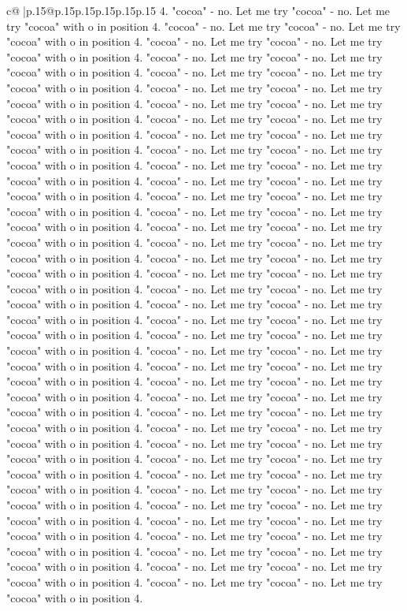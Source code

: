 \documentclass{article}
\begin{document}
{\begin{supertabular}{c@{$\;$}|p{.15\linewidth}@{}p{.15\linewidth}p{.15\linewidth}p{.15\linewidth}p{.15\linewidth}p{.15\linewidth}}
{{{4. "cocoa" {-} no. Let me try "cocoa" {-} no. Let me try "cocoa" with o in position 4. "cocoa" {-} no. Let me try "cocoa" {-} no. Let me try "cocoa" with o in position 4. "cocoa" {-} no. Let me try "cocoa" {-} no. Let me try "cocoa" with o in position 4. "cocoa" {-} no. Let me try "cocoa" {-} no. Let me try "cocoa" with o in position 4. "cocoa" {-} no. Let me try "cocoa" {-} no. Let me try "cocoa" with o in position 4. "cocoa" {-} no. Let me try "cocoa" {-} no. Let me try "cocoa" with o in position 4. "cocoa" {-} no. Let me try "cocoa" {-} no. Let me try "cocoa" with o in position 4. "cocoa" {-} no. Let me try "cocoa" {-} no. Let me try "cocoa" with o in position 4. "cocoa" {-} no. Let me try "cocoa" {-} no. Let me try "cocoa" with o in position 4. "cocoa" {-} no. Let me try "cocoa" {-} no. Let me try "cocoa" with o in position 4. "cocoa" {-} no. Let me try "cocoa" {-} no. Let me try "cocoa" with o in position 4. "cocoa" {-} no. Let me try "cocoa" {-} no. Let me try "cocoa" with o in position 4. "cocoa" {-} no. Let me try "cocoa" {-} no. Let me try "cocoa" with o in position 4. "cocoa" {-} no. Let me try "cocoa" {-} no. Let me try "cocoa" with o in position 4. "cocoa" {-} no. Let me try "cocoa" {-} no. Let me try "cocoa" with o in position 4. "cocoa" {-} no. Let me try "cocoa" {-} no. Let me try "cocoa" with o in position 4. "cocoa" {-} no. Let me try "cocoa" {-} no. Let me try "cocoa" with o in position 4. "cocoa" {-} no. Let me try "cocoa" {-} no. Let me try "cocoa" with o in position 4. "cocoa" {-} no. Let me try "cocoa" {-} no. Let me try "cocoa" with o in position 4. "cocoa" {-} no. Let me try "cocoa" {-} no. Let me try "cocoa" with o in position 4. "cocoa" {-} no. Let me try "cocoa" {-} no. Let me try "cocoa" with o in position 4. "cocoa" {-} no. Let me try "cocoa" {-} no. Let me try "cocoa" with o in position 4. "cocoa" {-} no. Let me try "cocoa" {-} no. Let me try "cocoa" with o in position 4. "cocoa" {-} no. Let me try "cocoa" {-} no. Let me try "cocoa" with o in position 4. "cocoa" {-} no. Let me try "cocoa" {-} no. Let me try "cocoa" with o in position 4. "cocoa" {-} no. Let me try "cocoa" {-} no. Let me try "cocoa" with o in position 4. "cocoa" {-} no. Let me try "cocoa" {-} no. Let me try "cocoa" with o in position 4. "cocoa" {-} no. Let me try "cocoa" {-} no. Let me try "cocoa" with o in position 4. "cocoa" {-} no. Let me try "cocoa" {-} no. Let me try "cocoa" with o in position 4. "cocoa" {-} no. Let me try "cocoa" {-} no. Let me try "cocoa" with o in position 4. "cocoa" {-} no. Let me try "cocoa" {-} no. Let me try "cocoa" with o in position 4. "cocoa" {-} no. Let me try "cocoa" {-} no. Let me try "cocoa" with o in position 4. "cocoa" {-} no. Let me try "cocoa" {-} no. Let me try "cocoa" with o in position 4. "cocoa" {-} no. Let me try "cocoa" {-} no. Let me try "cocoa" with o in position 4. "cocoa" {-} no. Let me try "cocoa" {-} no. Let me try "cocoa" with o in position 4. "cocoa" {-} no. Let me try "cocoa" {-} no. Let me try "cocoa" with o in position 4. "cocoa" {-} no. Let me try "cocoa" {-} no. Let me try "cocoa" with o in position 4. "cocoa" {-} no. Let me try "cocoa" {-} no. Let me try "cocoa" with o in position 4. }}}
\end{supertabular}}
\end{document}
